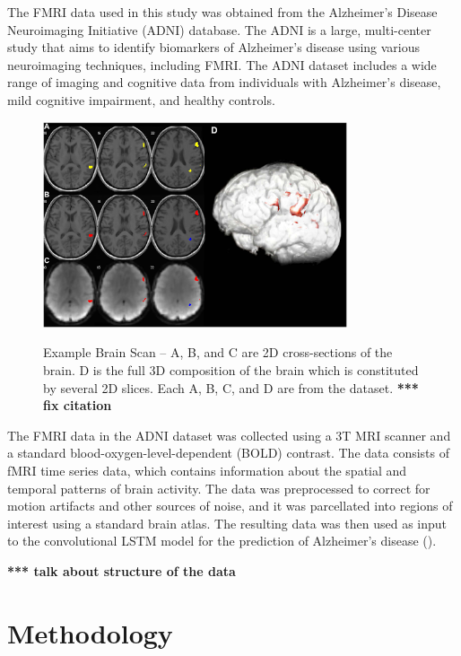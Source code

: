 \documentclass[10pt]{article}
\begin{document}
	The FMRI data used in this study was obtained from the Alzheimer's Disease Neuroimaging Initiative (ADNI) database. The ADNI is a large, multi-center study that aims to identify biomarkers of Alzheimer's disease using various neuroimaging techniques, including FMRI. The ADNI dataset includes a wide range of imaging and cognitive data from individuals with Alzheimer's disease, mild cognitive impairment, and healthy controls.

	\begin{figure}[!ht]
		\centering
		\includegraphics[width=0.8\textwidth]{figures/scan.png}
		\caption{Example Brain Scan -- A, B, and C are 2D cross-sections of the brain. D is the full 3D composition of the brain which is constituted by several 2D slices. Each A, B, C, and D are from the dataset. \textbf{*** fix citation}}
		\label{fig:example_brain_scan}
		
		\citep*{lab_handout}
	\end{figure}

	The FMRI data in the ADNI dataset was collected using a 3T MRI scanner and a standard blood-oxygen-level-dependent (BOLD) contrast. The data consists of fMRI time series data, which contains information about the spatial and temporal patterns of brain activity. The data was preprocessed to correct for motion artifacts and other sources of noise, and it was parcellated into regions of interest using a standard brain atlas. The resulting data was then used as input to the convolutional LSTM model for the prediction of Alzheimer's disease (\citep*{adni}). 

	\textbf{*** talk about structure of the data}

	\section{Methodology}
\end{document}
